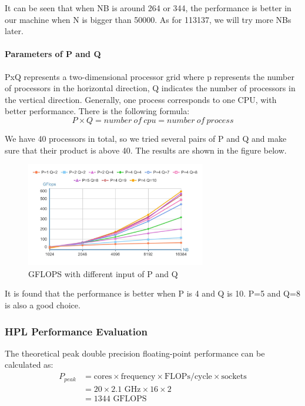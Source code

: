 \documentclass[a4paper,12pt]{article}
\begin{document}
It can be seen that when NB is around 264 or 344, the performance is better in our machine when N is bigger than 50000. As for 113137, we will try more NBs later.

\paragraph{Parameters of P and Q}

PxQ represents a two-dimensional processor grid where p represents the number of processors in the horizontal direction, Q indicates the number of processors in the vertical direction. Generally, one process corresponds to one CPU, with better performance. There is the following formula:
\begin{equation*}
P \times Q = number\ of\ cpu = number\ of\ process
\end{equation*}

We have 40 processors in total, so we tried several pairs of P and Q and make sure that their product is above 40. The results are shown in the figure below.

\begin{figure}[H]
    \centering
    \includegraphics[width=0.7\textwidth]{GFLOPS_PQ.png}
    \caption{GFLOPS with different input of P and Q}
    \label{fig:gflops_pq}
\end{figure}

It is found that the performance is better when P is 4 and Q is 10. P=5 and Q=8 is also a good choice.

\subsubsection{HPL Performance Evaluation}

The theoretical peak double precision floating-point performance can be calculated as:
\begin{equation}
    \begin{split}
        P_{peak} &= \text{cores} \times \text{frequency} \times \text{FLOPs/cycle} \times \text{sockets} \\
        &= 20 \times 2.1\text{ GHz} \times 16 \times 2 \\
        &= 1344 \text{ GFLOPS}
    \end{split}
\end{equation}
\end{document}
